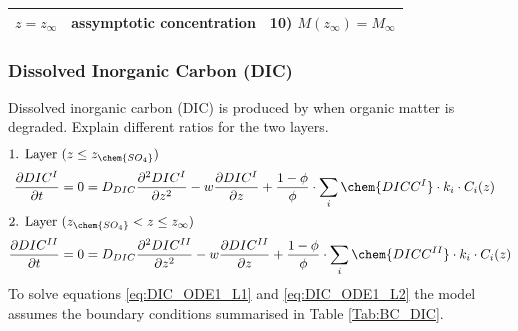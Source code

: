 \documentclass[gmd, manuscript]{copernicus}
\begin{document}
\begin{table}[tbp]
\begin{tabular}{ |l| l| l|}
$z=z_{\infty}$& assymptotic concentration & 10) $M(z_\infty)=M_\infty$\\
\hline    
\end{tabular}
\label{Tab:BC_PO4+M}
\end{table}

\subsubsection{Dissolved Inorganic Carbon (DIC)}
Dissolved inorganic carbon (DIC) is produced by when organic matter is degraded. Explain different ratios for the two layers. 
\begin{align}
\intertext{1. Layer ($z \leq z_{\chem{SO_4}}$)}
  \frac{\partial DIC^I}{\partial t} &= 0 = D_{DIC} \frac{\partial^2DIC^I }{\partial z^2} - w\frac{\partial DIC^I }{\partial z} + \frac{1-\phi}{\phi} \cdot \sum_i \chem{DICC^I} \cdot k_i \cdot C_{i}(z)\label{eq:DIC_ODE1_L1}\\ %
 \intertext{2. Layer ($z_{\chem{SO_4}} < z \leq z_\infty$)} 
  \frac{\partial DIC^{II}}{\partial t} &= 0 = D_{DIC} \frac{\partial^2DIC^{II} }{\partial z^2} - w\frac{\partial DIC^{II} }{\partial z} + \frac{1-\phi}{\phi} \cdot \sum_i \chem{DICC^{II}} \cdot k_i \cdot C_{i}(z)\label{eq:DIC_ODE1_L2} %
\end{align}
To solve equations \ref{eq:DIC_ODE1_L1} and \ref{eq:DIC_ODE1_L2} the model assumes the boundary conditions summarised in Table \ref{Tab:BC_DIC}.
\end{document}
